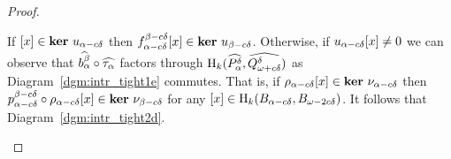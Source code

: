 \begin{proof}
\begin{enumerate}[label=\Roman*.]
    If $[x]\in\mathbf{ker}~u_{\alpha-c{\delta}}$ then $f_{\alpha - c{\delta}}^{\beta-c{\delta}}[x]\in\mathbf{ker}~u_{\beta-c{\delta}}$.
    Otherwise, if $u_{\alpha-c{\delta}}[x]\neq 0$ we can observe that $\widehat{b_\alpha^\beta}\circ\widehat{\tau_\alpha}$ factors through $\mathrm{H}_k(\widehat{P^{{\delta}}_\alpha}, \widehat{Q_{\omega + c{\delta}}^{\delta}})$ as Diagram~\ref{dgm:intr_tight1e} commutes.
    That is, if $\rho_{\alpha -c{\delta}}[x]\in\mathbf{ker}~\nu_{\alpha-c{\delta}}$ then $p_{\alpha-c{\delta}}^{\beta-c{\delta}}\circ\rho_{\alpha-c{\delta}}[x]\in\mathbf{ker}~\nu_{\beta-c{\delta}}$ for any $[x]\in \mathrm{H}_k(B_{\alpha-c{\delta}}, B_{\omega - 2c{\delta}})$.
    It follows that Diagram~\ref{dgm:intr_tight2d}.
  \end{enumerate}



\end{proof}
